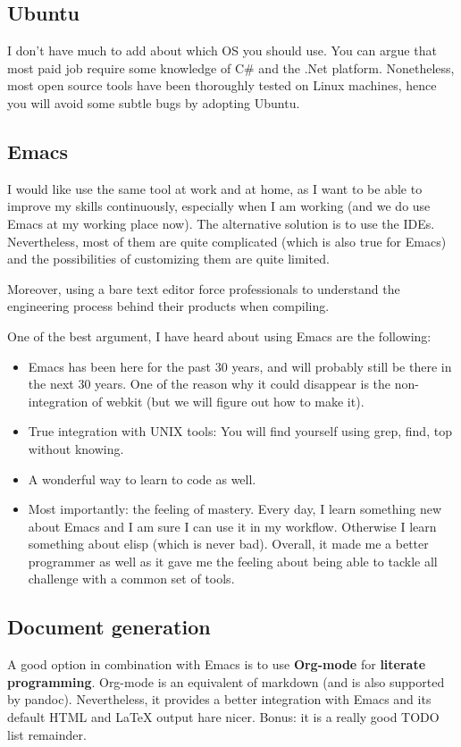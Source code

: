 \documentclass[11pt]{article}
\begin{document}
\subsection{Ubuntu}
\label{sec:org58ce54b}
I don't have much to add about which OS you should use. You can argue that
most paid job require some knowledge of C\# and the .Net platform.
Nonetheless, most open source tools have been thoroughly tested on Linux
machines, hence you will avoid some subtle bugs by adopting Ubuntu.

\subsection{Emacs}
\label{sec:orgb8de454}

I would like use the same tool at work and at home, as I want to be able to
improve my skills continuously, especially when I am working (and we do use
Emacs at my working place now).  The alternative solution is to use the
IDEs.  Nevertheless, most of them are quite complicated (which is also true
for Emacs) and the possibilities of customizing them are quite limited.

Moreover, using a bare text editor force professionals to understand the
engineering process behind their products when compiling.

One of the best argument, I have heard about using Emacs are the following:
\begin{itemize}
\item Emacs has been here for the past 30 years, and will probably still be
there in the next 30 years. One of the reason why it could disappear is
the non-integration of webkit (but we will figure out how to make it).
\item True integration with UNIX tools: You will find yourself using grep,
find, top without knowing.
\item A wonderful way to learn to code as well.
\item Most importantly: the feeling of mastery. Every day, I learn something
new about Emacs and I am sure I can use it in my workflow. Otherwise I
learn something about elisp (which is never bad). Overall, it made me a
better programmer as well as it gave me the feeling about being able to
tackle all challenge with a common set of tools.
\end{itemize}

\subsection{Document generation}
\label{sec:org96aa316}
A good option in combination with Emacs is to use \textbf{Org-mode} for \textbf{literate
programming}. Org-mode is an equivalent of markdown (and is also supported
by pandoc). Nevertheless, it provides a better integration with Emacs and
its default HTML and \LaTeX{} output hare nicer. Bonus: it is a really good
TODO list remainder.
\end{document}
